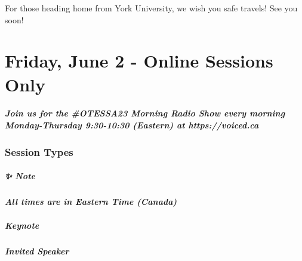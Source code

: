 \documentclass[
]{book}
\begin{document}
For those heading home from York University, we wish you safe travels! See you soon!

\hypertarget{friday-june-2---online-sessions-only}{%
\chapter{Friday, June 2 - Online Sessions Only}\label{friday-june-2---online-sessions-only}}

\begin{protip}
\hypertarget{join-us-for-the-otessa23-morning-radio-show-every-morning-monday-thursday-930-1030-eastern-at-httpsvoiced.ca}{%
\paragraph{Join us for the \#OTESSA23 Morning Radio Show every morning
Monday-Thursday 9:30-10:30 (Eastern) at
https://voiced.ca}\label{join-us-for-the-otessa23-morning-radio-show-every-morning-monday-thursday-930-1030-eastern-at-httpsvoiced.ca}}
\end{protip}

\hypertarget{session-types-4}{%
\subsection*{Session Types}\label{session-types-4}}

\begin{protip}
\hypertarget{note}{%
\paragraph*{✨ Note}\label{note}}

\textbf{\emph{All times are in Eastern Time (Canada)}}
\end{protip}

\begin{keynote}
\hypertarget{keynote}{%
\paragraph{Keynote}\label{keynote}}
\end{keynote}

\begin{speaker}
\hypertarget{invited-speaker}{%
\paragraph{Invited Speaker}\label{invited-speaker}}
\end{speaker}
\end{document}
